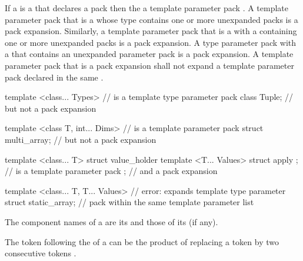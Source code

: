 \documentclass{wg21}
\begin{document}
\pnum
If a  is a
 that declares a
pack 
then the 
 a template parameter pack .
A template parameter pack that is a  whose type
contains one or more unexpanded packs is a pack expansion. Similarly,
a template parameter pack that is a  with a
 containing one or more unexpanded
packs is a pack expansion.
A type parameter pack with a  that
contains an unexpanded parameter pack is a pack expansion.
A template parameter pack that is a pack
expansion shall not expand a template parameter pack declared in the same
.
\begin{example}
\begin{codeblock}
    template <class... Types>                       //  is a template type parameter pack
    class Tuple;                                 // but not a pack expansion

    template <class T, int... Dims>                 //  is a  template parameter pack
    struct multi_array;                          // but not a pack expansion

    template <class... T>
    struct value_holder {
        template <T... Values> struct apply { };    //  is a  template parameter pack
    };                                            // and a pack expansion

    template <class... T, T... Values>              // error:  expands template type parameter
    struct static_array;                          // pack  within the same template parameter list
\end{codeblock}
\end{example}

%
The component names of a  are
its  and
those of its  (if any).

\begin{note}
    The \tcode{>} token following the
     of a
    can be the product of replacing a
    \tcode{>>} token by two consecutive \tcode{>}
    tokens .
\end{note}
\end{document}
